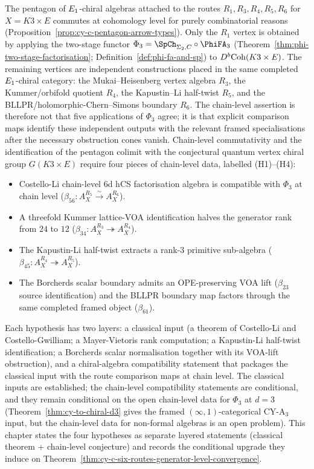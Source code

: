 The pentagon of $E_{1}$-chiral algebras attached to the routes
$R_1, R_3, R_4, R_5, R_6$ for $X = K3 \times E$ commutes at cohomology level
for purely combinatorial reasons (Proposition~\ref{prop:cy-c-pentagon-arrow-types}).
Only the $R_1$ vertex is obtained by applying the two-stage functor
\(\Phi_3=\SpCh_{\Sigma_2,C}\circ\PhiFA_3\)
(Theorem~\ref{thm:phi-two-stage-factorisation};
Definition~\ref{def:phi-fa-and-sp}) to \(D^b\mathrm{Coh}(K3\times E)\).
The remaining vertices are independent constructions placed in the same
completed \(E_{1}\)-chiral category: the Mukai--Heisenberg vertex algebra \(R_3\), the
Kummer/orbifold quotient \(R_4\), the Kapustin--Li half-twist \(R_5\),
and the BLLPR/holomorphic-Chern--Simons boundary \(R_6\). The
chain-level assertion is therefore not that five applications of
\(\Phi_3\) agree; it is that explicit comparison maps identify these
independent outputs with the relevant framed specialisations after the
necessary obstruction cones vanish. Chain-level commutativity and the
identification of the pentagon colimit with the conjectural quantum
vertex chiral group \(G(K3\times E)\) require four pieces of
chain-level data, labelled (H1)--(H4):
\begin{itemize}
 \item[(H1)] Costello-Li chain-level $6$d hCS factorisation algebra is
 compatible with $\Phi_3$ at chain level
 ($\beta_{56}: A_X^{R_5} \xrightarrow{\sim} A_X^{R_6}$).
 \item[(H2)] A threefold Kummer lattice-VOA identification halves the
 generator rank from $24$ to $12$
 ($\beta_{34}: A_X^{R_3} \twoheadrightarrow A_X^{R_4}$).
 \item[(H3)] The Kapustin-Li half-twist extracts a rank-$3$ primitive
 sub-algebra
 ($\beta_{45}: A_X^{R_4} \twoheadrightarrow A_X^{R_5}$).
 \item[(H4)] The Borcherds scalar boundary admits an OPE-preserving
 VOA lift ($\beta_{23}$ source identification) and the BLLPR boundary
 map factors through the same completed framed object ($\beta_{61}$).
\end{itemize}

Each hypothesis has two layers: a classical input (a theorem of Costello-Li
and Costello-Gwilliam; a Mayer-Vietoris rank computation; a Kapustin-Li
half-twist identification; a Borcherds scalar normalisation together with
its VOA-lift obstruction), and a
chiral-algebra compatibility statement that packages the classical input
with the route comparison maps at chain level. The
classical inputs are established; the chain-level compatibility statements
are conditional, and they remain conditional on the open chain-level data
for $\Phi_3$ at $d = 3$ (Theorem~\ref{thm:cy-to-chiral-d3} gives the
framed \((\infty,1)\)-categorical CY-A$_3$ input, but the chain-level
data for non-formal algebras is an open problem). This chapter states the four hypotheses as
separate layered statements (classical theorem + chain-level conjecture) and
records the conditional upgrade they induce on
Theorem~\ref{thm:cy-c-six-routes-generator-level-convergence}.

